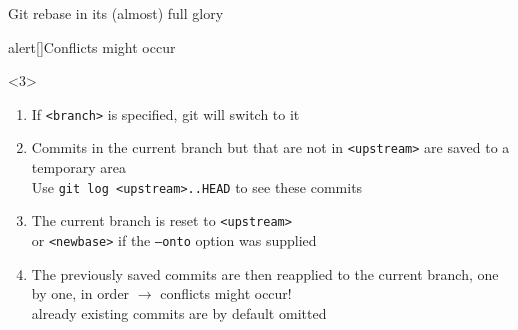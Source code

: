 \documentclass[usenames,svgnames,14pt]{beamer}
\begin{document}
\begin{frame}[fragile]{Git rebase in its (almost) full glory}
\begin{overlayarea}{\textwidth}{0.5\textheight}
\begin{onlyenv}
\begin{varblock*}{alert}[\textwidth]{Conflicts might occur}
\begin{overlayarea}{\textwidth}{0.12\textheight}
\begin{onlyenv}
\begin{itemize}
                        \end{itemize}
                    \end{onlyenv}
                \end{overlayarea}
                \vspace{1pt}
            \end{varblock*}
        \end{onlyenv}
        \begin{onlyenv}<3>
            \newcommand{\opt}[1]{\;\textcolor{environment-color}{\texttt{#1}}\;}
            \begin{enumerate}
                \item If \opt{<branch>} is specified, git will switch to it%
                \item Commits in the current branch but that are not in \opt{<upstream>} are saved to a temporary area\\
                      {\footnotesize\then Use \;\texttt{git log <upstream>..HEAD}\; to see these commits}
                \item The current branch is reset to \opt{<upstream>}\\
                      {\footnotesize\then or \opt{<newbase>} if the \opt{--onto} option was supplied}
                \item The previously saved commits are then reapplied to the current branch, one by one, in order
                      $\to$ \alert{conflicts might occur!}\\
                      {\footnotesize\then already existing commits are by default omitted}
            \end{enumerate}
        \end{onlyenv}
    \end{overlayarea}
\end{frame}
\end{document}
